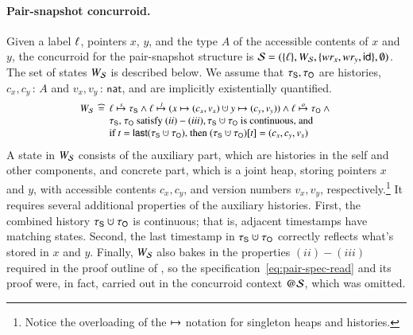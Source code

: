 \paragraph{Pair-snapshot concurroid.}
Given a label $\ell$, pointers $x$, $y$, and the type $A$ of the
accessible contents of $x$ and $y$, the concurroid for the
pair-snapshot structure is ${\mathcal{S}} = (\{\ell\}, W_{\mathcal{S}}, \{wr_x,
wr_y, \mathsf{id}\}, \emptyset)$.
%
The set of states $W_{\mathcal{S}}$ is described below. We assume that
$\tau_{\mathsf{S}}, \tau_{\mathsf{O}}$ are histories, $c_x, c_y\,{:}\,A$ and $v_x,
v_y\,{:}\,\mathsf{nat}$, and are implicitly existentially quantified.
%
%
\[
{\small
\begin{array}{l@{\ }c@{\ }l}
W_{\pscon} & \eqdef & \hps \spts \histS \aand \hps \jpts (x \hpts (c_x, v_x) \hunion y \hpts (c_y, v_y)) \aand \hps \opts \histO \aand \hbox{}\\
    & & \mbox{$\histS$, $\histO$ satisfy $(ii)-(iii)$}, \mbox{$\histS \hunion \histO$ is continuous, and}\\
    & & \mbox{if $t = \last{\histS \hunion \histO}$, then $(\histS \hunion \histO)[t] = (c_x, c_y, v_x)$}
\end{array}
}
\]
%
A state in $W_{\mathcal{S}}$ consists of the auxiliary part, which are
histories in the self and other components, and concrete part, which
is a joint heap, storing pointers $x$ and $y$, with accessible
contents $c_x, c_y$, and version numbers $v_x, v_y$,
respectively.\footnote{Notice the overloading of the $\mapsto$ notation
  for singleton heaps and histories.}
%
It requires several additional properties of the auxiliary
histories. First, the combined history $\histS \hunion \histO$ is
continuous; that is, adjacent timestamps have matching states. Second,
the last timestamp in $\histS \hunion \histO$ correctly reflects
what's stored in $x$ and $y$. Finally, $W_{\mathcal{S}}$ also bakes in the
properties $(ii)-(iii)$ required in the proof outline of
, so the specification~\eqref{eq:pair-spec-read} and
its proof were, in fact, carried out in the concurroid context
$@\mathcal{S}$, which was omitted.

